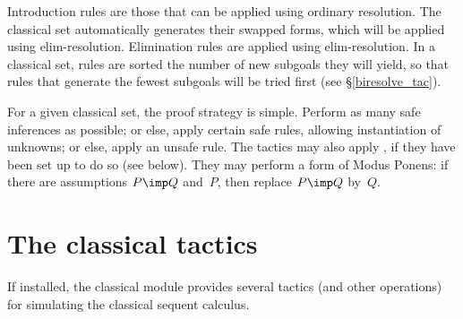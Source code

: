 Introduction rules are those that can be applied using ordinary resolution.
The classical set automatically generates their swapped forms, which will
be applied using elim-resolution.  Elimination rules are applied using
elim-resolution.  In a classical set, rules are sorted the number of new
subgoals they will yield, so that rules that generate the fewest subgoals
will be tried first (see \S\ref{biresolve_tac}).

For a given classical set, the proof strategy is simple.  Perform as many
safe inferences as possible; or else, apply certain safe rules, allowing
instantiation of unknowns; or else, apply an unsafe rule.  The tactics may
also apply , if they have been set up to do so (see
below).  They may perform a form of Modus Ponens: if there are assumptions
$P\imp Q$ and~$P$, then replace $P\imp Q$ by~$Q$.


\section{The classical tactics}
If installed, the classical module provides several tactics (and other
operations) for simulating the classical sequent calculus.

